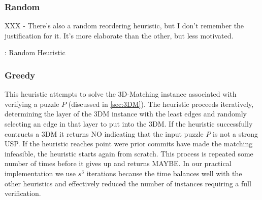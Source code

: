 \documentclass[11pt]{article}
\begin{document}
\subsubsection{Random}

XXX - There's also a random reordering heuristic, but I don't remember
the justification for it.  It's more elaborate than the other, but
less motivated.

\begin{algorithm}
  \caption{: Random Heuristic}
  \label{alg:random}
\begin{algorithmic}[1]
  \EndFunction
\end{algorithmic}
\end{algorithm}

\subsubsection{Greedy}

This heuristic attempts to solve the 3D-Matching instance associated
with verifying a puzzle $P$ (discussed in \autoref{sec:3DM}).  The
heuristic proceeds iteratively, determining the layer of the 3DM
instance with the least edges and randomly selecting an edge in that
layer to put into the 3DM.  If the heuristic successfully contructs a
3DM it returns NO indicating that the input puzzle $P$ is not a strong
USP.  If the heuristic reaches point were prior commits have made the
matching infeasible, the heuristic starts again from scratch.  This
process is repeated some number of times before it gives up and
returns MAYBE.  In our practical implementation we use $s^3$
iterations because the time balances well with the other heuristics
and effectively reduced the number of instances requiring a full
verification.
\end{document}

